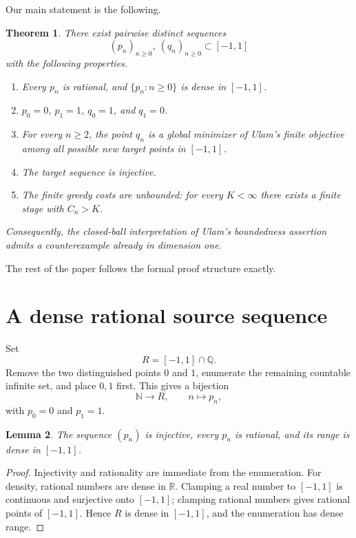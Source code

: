 \documentclass[11pt]{amsart}
\newtheorem{theorem}{Theorem}[section]
\newtheorem{lemma}[theorem]{Lemma}
\theoremstyle{definition}
\theoremstyle{remark}
\newcommand{\R}{\mathbb R}
\newcommand{\Q}{\mathbb Q}
\begin{document}
Our main statement is the following.

\begin{theorem}\label{thm:main}
There exist pairwise distinct sequences
\[
(p_n)_{n\ge0},\ (q_n)_{n\ge0}\subset[-1,1]
\]
with the following properties.
\begin{enumerate}[label=\textup{(\roman*)}]
\item Every $p_n$ is rational, and $\{p_n:n\ge0\}$ is dense in $[-1,1]$.
\item $p_0=0$, $p_1=1$, $q_0=1$, and $q_1=0$.
\item For every $n\ge2$, the point $q_n$ is a global minimizer of Ulam's finite objective among all possible new target points in $[-1,1]$.
\item The target sequence is injective.
\item The finite greedy costs are unbounded: for every $K<\infty$ there exists a finite stage with $C_n>K$.
\end{enumerate}
Consequently, the closed-ball interpretation of Ulam's boundedness assertion admits a counterexample already in dimension one.
\end{theorem}

The rest of the paper follows the formal proof structure exactly.

\section{A dense rational source sequence}

Set
\[
R=[-1,1]\cap\Q.
\]
Remove the two distinguished points $0$ and $1$, enumerate the remaining countable infinite set, and place $0,1$ first.  This gives a bijection
\[
\mathbb N\longrightarrow R,
\qquad n\longmapsto p_n,
\]
with $p_0=0$ and $p_1=1$.

\begin{lemma}\label{lem:source}
The sequence $(p_n)$ is injective, every $p_n$ is rational, and its range is dense in $[-1,1]$.
\end{lemma}

\begin{proof}
Injectivity and rationality are immediate from the enumeration.  For density, rational numbers are dense in $\R$.  Clamping a real number to $[-1,1]$ is continuous and surjective onto $[-1,1]$; clamping rational numbers gives rational points of $[-1,1]$.  Hence $R$ is dense in $[-1,1]$, and the enumeration has dense range.
\end{proof}
\end{document}
